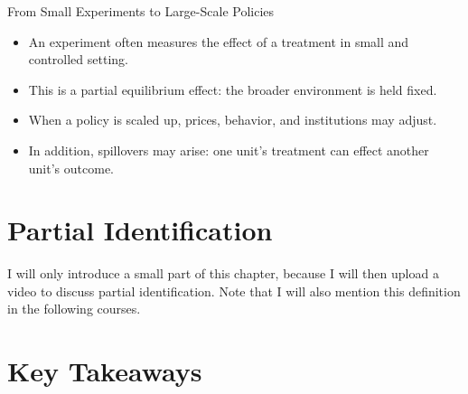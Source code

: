\documentclass[11pt,aspectratio=169]{beamer}
\begin{document}
\begin{frame}{From Small Experiments to Large-Scale Policies}
\begin{itemize}
  \item An experiment often measures the effect of a treatment in small and controlled setting.
  \item This is a partial equilibrium effect: the broader environment is held fixed.
  \item When a policy is scaled up, prices, behavior, and institutions may adjust.
  \item In addition, spillovers may arise: one unit's treatment can effect another unit's outcome.
\end{itemize}

\end{frame}



\section{Partial Identification}

\begin{frame}

I will only introduce a small part of this chapter, because I will then upload a video to discuss partial identification. Note that I will also mention this definition in the following courses.

\end{frame}

\begin{frame}


\end{frame}

\begin{frame}


\end{frame}

\begin{frame}


\end{frame}

\begin{frame}


\end{frame}

\begin{frame}


\end{frame}

\begin{frame}


\end{frame}





\section{Key Takeaways}
\end{document}
